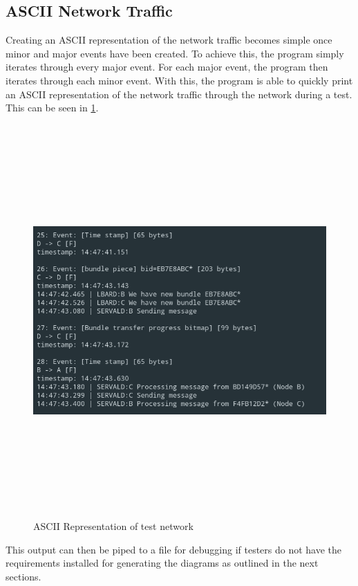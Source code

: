 \subsection{ASCII Network Traffic}
Creating an ASCII representation of the network traffic becomes simple once minor and major events have been created.
To achieve this, the program simply iterates through every major event.
For each major event, the program then iterates through each minor event.
With this, the program is able to quickly print an ASCII representation of the network traffic through the network during a test.
This can be seen in \figurename{ \ref{fig:chapter5ASCIIRep}}.
\begin{figure}
    \begin{centering}
        \includegraphics[width=15cm,height=15cm,keepaspectratio]{Figures/Chapter5-ASCIIRepresentation.png}
        \caption{ASCII Representation of test network}
        \label{fig:chapter5ASCIIRep}
    \end{centering}
\end{figure}

This output can then be piped to a file for debugging if testers do not have the requirements installed for generating the diagrams as outlined in the next sections.




